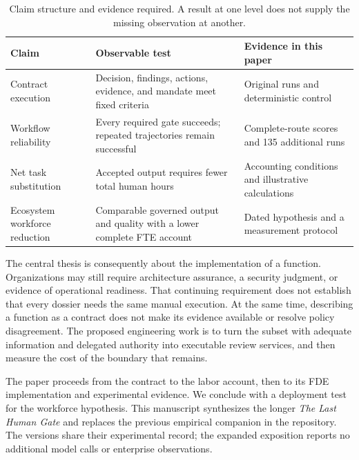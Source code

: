\begin{table}[!htb]
\centering\small
\caption{Claim structure and evidence required. A result at one level does not supply the
missing observation at another.}
\label{tab:claim-structure}
\begin{tabularx}{\linewidth}{@{}P{2.8cm}LL@{}}
\toprule
Claim & Observable test & Evidence in this paper\\
\midrule
Contract execution & Decision, findings, actions, evidence, and mandate meet fixed criteria & Original runs and deterministic control\\
Workflow reliability & Every required gate succeeds; repeated trajectories remain successful & Complete-route scores and 135 additional runs\\
Net task substitution & Accepted output requires fewer total human hours & Accounting conditions and illustrative calculations\\
Ecosystem workforce reduction & Comparable governed output and quality with a lower complete FTE account & Dated hypothesis and a measurement protocol\\
\bottomrule
\end{tabularx}
\end{table}

The central thesis is consequently about the implementation of a function. Organizations may
still require architecture assurance, a security judgment, or evidence of operational readiness.
That continuing requirement does not establish that every dossier needs the same manual
execution. At the same time, describing a function as a contract does not make its evidence
available or resolve policy disagreement. The proposed engineering work is to turn the subset
with adequate information and delegated authority into executable review services, and then
measure the cost of the boundary that remains.

The paper proceeds from the contract to the labor account, then to its FDE implementation and
experimental evidence. We conclude with a deployment test for the workforce hypothesis.
This manuscript synthesizes the longer \emph{The Last Human Gate} and replaces the previous
empirical companion in the repository. The versions share their experimental record;
the expanded exposition reports no additional model calls or enterprise observations.
